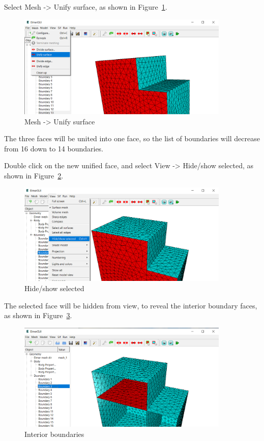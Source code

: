 Select Mesh -> Unify surface, as shown in Figure~\ref{fg:elmergui-5}.

\begin{figure}[H]
\centering
\includegraphics[width=0.9\textwidth]{elmergui-5}
\caption{Mesh -> Unify surface}\label{fg:elmergui-5}
\end{figure}

The three faces will be united into one face, so the list of boundaries will decrease from 16 down to 14 boundaries.  

\newpage

Double click on the new unified face, and select View -> Hide/show selected, as shown in Figure~\ref{fg:elmergui-6}.

\begin{figure}[H]
\centering
\includegraphics[width=0.9\textwidth]{elmergui-6}
\caption{Hide/show selected}\label{fg:elmergui-6}
\end{figure}

The selected face will be hidden from view, to reveal the interior boundary faces, as shown in Figure~\ref{fg:elmergui-7}.

\begin{figure}[H]
\centering
\includegraphics[width=0.9\textwidth]{elmergui-7}
\caption{Interior boundaries}\label{fg:elmergui-7}
\end{figure}

